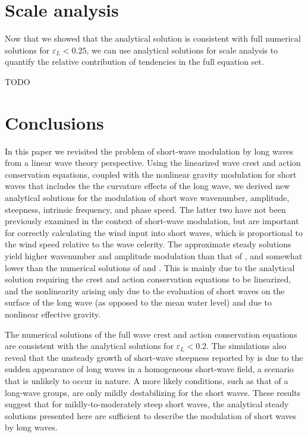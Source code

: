 \documentclass[lineno]{jfm}
\begin{document}
\section{Scale analysis}
\label{section:scale_analysis}

Now that we showed that the analytical solution is consistent with full numerical
solutions for $\varepsilon_L < 0.25$, we can use analytical solutions for scale
analysis to quantify the relative contribution of tendencies in the full equation set.

TODO

\section{Conclusions}
\label{section:conclusions}

In this paper we revisited the problem of short-wave modulation by long waves
from a linear wave theory perspective.
Using the linearized wave crest and action conservation equations, coupled with
the nonlinear gravity modulation for short waves that includes the the curvature
effects of the long wave, we derived new analytical solutions for the modulation
of short wave wavenumber, amplitude, steepness, intrinsic frequency, and phase
speed.
The latter two have not been previously examined in the context of short-wave
modulation, but are important for correctly calculating the wind input into
short waves, which is proportional to the wind speed relative to the wave
celerity.
The approximate steady solutions yield higher wavenumber and amplitude
modulation than that of \citet{longuet1960changes}, and somewhat lower than 
the numerical solutions of \citet{longuet1987propagation} and
\citet{zhang1990evolution}.
This is mainly due to the analytical solution requiring the crest and action
conservation equations to be linearized, and the nonlinearity arising only due
to the evaluation of short waves on the surface of the long wave (as opposed to
the mean water level) and due to nonlinear effective gravity.

The numerical solutions of the full wave crest and action conservation equations
are consistent with the analytical solutions for $\varepsilon_L < 0.2$.
The simulations also reveal that the unsteady growth of short-wave steepness
reported by \citet{peureux2021unsteady} is due to the sudden appearance of
long waves in a homogeneous short-wave field, a scenario that is unlikely to
occur in nature.
A more likely conditions, such as that of a long-wave groups, are only mildly
destabilizing for the short waves.
These results suggest that for mildly-to-moderately steep short waves,
the analytical steady solutions presented here are sufficient to describe the
modulation of short waves by long waves.
\end{document}
